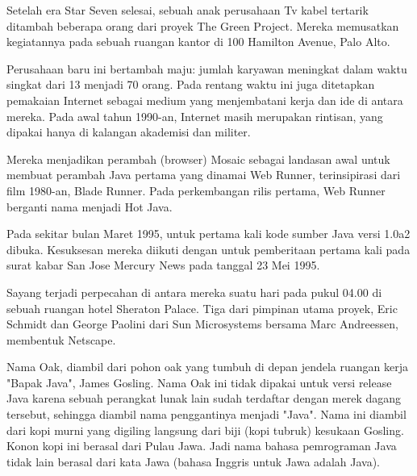 Setelah era Star Seven selesai, sebuah anak perusahaan Tv kabel tertarik ditambah beberapa orang dari proyek The Green Project. Mereka memusatkan kegiatannya pada sebuah ruangan kantor di 100 Hamilton Avenue, Palo Alto.

Perusahaan baru ini bertambah maju: jumlah karyawan meningkat dalam waktu singkat dari 13 menjadi 70 orang. Pada rentang waktu ini juga ditetapkan pemakaian Internet sebagai medium yang menjembatani kerja dan ide di antara mereka. Pada awal tahun 1990-an, Internet masih merupakan rintisan, yang dipakai hanya di kalangan akademisi dan militer.

Mereka menjadikan perambah (browser) Mosaic sebagai landasan awal untuk membuat perambah Java pertama yang dinamai Web Runner, terinsipirasi dari film 1980-an, Blade Runner. Pada perkembangan rilis pertama, Web Runner berganti nama menjadi Hot Java.

Pada sekitar bulan Maret 1995, untuk pertama kali kode sumber Java versi 1.0a2 dibuka. Kesuksesan mereka diikuti dengan untuk pemberitaan pertama kali pada surat kabar San Jose Mercury News pada tanggal 23 Mei 1995.

Sayang terjadi perpecahan di antara mereka suatu hari pada pukul 04.00 di sebuah ruangan hotel Sheraton Palace. Tiga dari pimpinan utama proyek, Eric Schmidt dan George Paolini dari Sun Microsystems bersama Marc Andreessen, membentuk Netscape.

Nama Oak, diambil dari pohon oak yang tumbuh di depan jendela ruangan kerja "Bapak Java", James Gosling. Nama Oak ini tidak dipakai untuk versi release Java karena sebuah perangkat lunak lain sudah terdaftar dengan merek dagang tersebut, sehingga diambil nama penggantinya menjadi "Java". Nama ini diambil dari kopi murni yang digiling langsung dari biji (kopi tubruk) kesukaan Gosling. Konon kopi ini berasal dari Pulau Jawa. Jadi nama bahasa pemrograman Java tidak lain berasal dari kata Jawa (bahasa Inggris untuk Jawa adalah Java).

